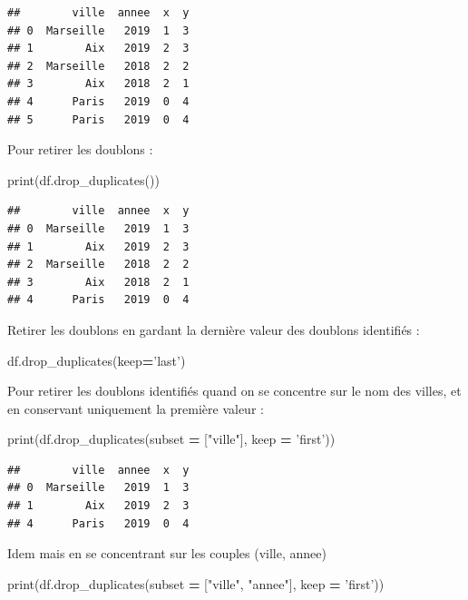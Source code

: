 \documentclass[12pt,]{book}
\newenvironment{Shaded}{\begin{snugshade}}{\end{snugshade}}
\newcommand{\StringTok}[1]{\textcolor[rgb]{0.31,0.60,0.02}{#1}}
\newcommand{\OperatorTok}[1]{\textcolor[rgb]{0.81,0.36,0.00}{\textbf{#1}}}
\newcommand{\BuiltInTok}[1]{#1}
\newcommand{\NormalTok}[1]{#1}
\numberwithin{equation}{section}
\numberwithin{countremarque}{section}
\begin{document}
\begin{lstlisting}
##        ville  annee  x  y
## 0  Marseille   2019  1  3
## 1        Aix   2019  2  3
## 2  Marseille   2018  2  2
## 3        Aix   2018  2  1
## 4      Paris   2019  0  4
## 5      Paris   2019  0  4
\end{lstlisting}

Pour retirer les doublons :

\begin{Shaded}
\begin{Highlighting}[]
\BuiltInTok{print}\NormalTok{(df.drop_duplicates())}
\end{Highlighting}
\end{Shaded}

\begin{lstlisting}
##        ville  annee  x  y
## 0  Marseille   2019  1  3
## 1        Aix   2019  2  3
## 2  Marseille   2018  2  2
## 3        Aix   2018  2  1
## 4      Paris   2019  0  4
\end{lstlisting}

Retirer les doublons en gardant la dernière valeur des doublons
identifiés :

\begin{Shaded}
\begin{Highlighting}[]
\NormalTok{df.drop_duplicates(keep}\OperatorTok{=}\StringTok{'last'}\NormalTok{)}
\end{Highlighting}
\end{Shaded}

Pour retirer les doublons identifiés quand on se concentre sur le nom
des villes, et en conservant uniquement la première valeur :

\begin{Shaded}
\begin{Highlighting}[]
\BuiltInTok{print}\NormalTok{(df.drop_duplicates(subset }\OperatorTok{=}\NormalTok{ [}\StringTok{"ville"}\NormalTok{], keep }\OperatorTok{=} \StringTok{'first'}\NormalTok{))}
\end{Highlighting}
\end{Shaded}

\begin{lstlisting}
##        ville  annee  x  y
## 0  Marseille   2019  1  3
## 1        Aix   2019  2  3
## 4      Paris   2019  0  4
\end{lstlisting}

Idem mais en se concentrant sur les couples (ville, annee)

\begin{Shaded}
\begin{Highlighting}[]
\BuiltInTok{print}\NormalTok{(df.drop_duplicates(subset }\OperatorTok{=}\NormalTok{ [}\StringTok{"ville"}\NormalTok{, }\StringTok{"annee"}\NormalTok{], keep }\OperatorTok{=} \StringTok{'first'}\NormalTok{))}
\end{Highlighting}
\end{Shaded}
\end{document}
